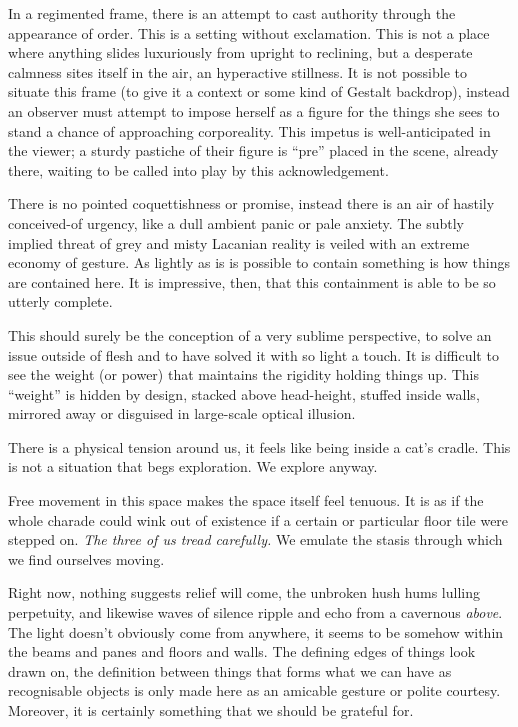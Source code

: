 \documentclass{book}
\begin{document}
In a regimented frame, there is an attempt to cast authority through the
appearance of order. This is a setting without exclamation. This is not a place
where anything slides luxuriously from upright to reclining, but a desperate
calmness sites itself in the air, an hyperactive stillness. It is not possible
to situate this frame (to give it a context or some kind of Gestalt backdrop),
instead an observer must attempt to impose herself as a figure for the things
she sees to stand a chance of approaching corporeality. This impetus is
well-anticipated in the viewer; a sturdy pastiche of their figure is ``pre''
placed in the scene, already there, waiting to be called into play by this
acknowledgement.

There is no pointed coquettishness or promise, instead there is an air of
hastily conceived-of urgency, like a dull ambient panic or pale anxiety. The
subtly implied threat of grey and misty Lacanian reality is veiled with an
extreme economy of gesture. As lightly as is is possible to contain something
is how things are contained here. It is impressive, then, that this containment
is able to be so utterly complete.

This should surely be the conception of a very sublime perspective, to solve an
issue outside of flesh and to have solved it with so light a touch. It is
difficult to see the weight (or power) that maintains the rigidity holding
things up.  This ``weight'' is hidden by design, stacked above head-height,
stuffed inside walls, mirrored away or disguised in large-scale optical
illusion.

There is a physical tension around us, it feels like being inside a cat's
cradle. This is not a situation that begs exploration. We explore anyway.

Free movement in this space makes the space itself feel tenuous. It is as if
the whole charade could wink out of existence if a certain or particular floor
tile were stepped on.  \emph{The three of us tread carefully.} We emulate the
stasis through which we find ourselves moving.

Right now, nothing suggests relief will come, the unbroken hush hums lulling
perpetuity, and likewise waves of silence ripple and echo from a cavernous
\emph{above}.  The light doesn't obviously come from anywhere, it seems to be
somehow within the beams and panes and floors and walls. The defining edges of
things look drawn on, the definition between things that forms what we can have
as recognisable objects is only made here as an amicable gesture or polite
courtesy. Moreover, it is certainly something that we should be grateful for.
\end{document}
